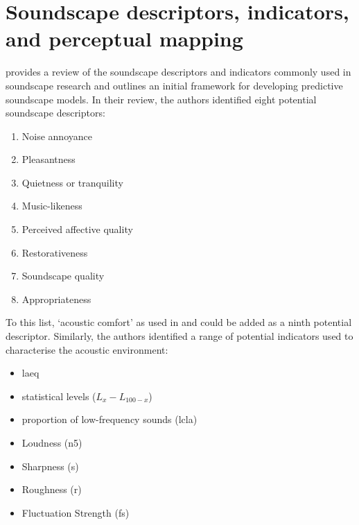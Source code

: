 

\section{Soundscape descriptors, indicators, and perceptual mapping}
\citet{Aletta2016Soundscape} provides a review of the soundscape descriptors and indicators commonly used in soundscape research and outlines an initial framework for developing predictive soundscape models. In their review, the authors identified eight potential soundscape descriptors:

\begin{enumerate}
  \item Noise annoyance
  \item Pleasantness
  \item Quietness or tranquility
  \item Music-likeness
  \item Perceived affective quality
  \item Restorativeness
  \item Soundscape quality
  \item Appropriateness
\end{enumerate}

To this list, `acoustic comfort' as used in \citet{Yang2005Acoustic} and \citet{Vardaxis2018Reviewa} could be added as a ninth potential descriptor. Similarly, the authors identified a range of potential indicators used to characterise the acoustic environment:

\begin{itemize}
  \item \gls{laeq}
  \item statistical levels ($L_x-L_{100-x}$)
  \item proportion of low-frequency sounds (\gls{lcla})
  \item Loudness (\gls{n5})
  \item Sharpness (\gls{s})
  \item Roughness (\gls{r})
  \item Fluctuation Strength (\gls{fs})
\end{itemize}

